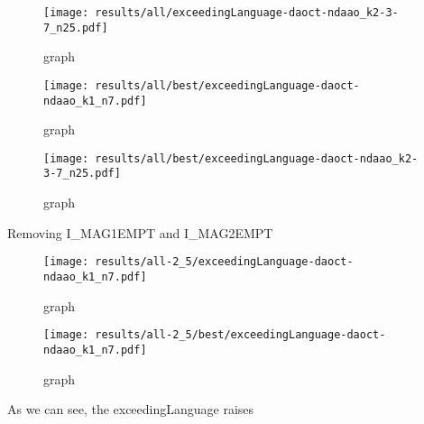 \begin{figure}[H]
  \centering
  \texttt{[image: results/all/exceedingLanguage-daoct-ndaao\_k2-3-7\_n25.pdf]}
  \caption{graph}
\end{figure}


\begin{figure}[H]
  \centering
  \texttt{[image: results/all/best/exceedingLanguage-daoct-ndaao\_k1\_n7.pdf]}
  \caption{graph}
\end{figure}


\begin{figure}[H]
  \centering
  \texttt{[image: results/all/best/exceedingLanguage-daoct-ndaao\_k2-3-7\_n25.pdf]}
  \caption{graph}
\end{figure}

Removing I\_MAG1EMPT and I\_MAG2EMPT

\begin{figure}[H]
  \centering
  \texttt{[image: results/all-2\_5/exceedingLanguage-daoct-ndaao\_k1\_n7.pdf]}
  \caption{graph}
\end{figure}


\begin{figure}[H]
  \centering
  \texttt{[image: results/all-2\_5/best/exceedingLanguage-daoct-ndaao\_k1\_n7.pdf]}
  \caption{graph}
\end{figure}

As we can see, the exceedingLanguage raises




